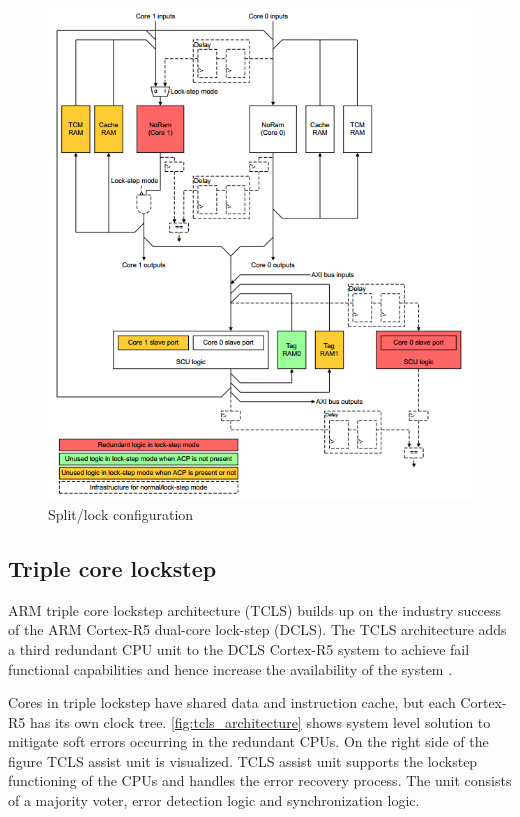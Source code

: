 \begin{figure}[H]

      \centering
      \includegraphics[width=1\linewidth]{images/split_lock_configuration.png}
      \caption{Split/lock configuration \citep{cortex_r8_reference_manual}}
      \label{fig:split_lock_configuration}
    
\end{figure}

\subsection{Triple core lockstep}

ARM triple core lockstep architecture (TCLS) builds up on the industry success of the ARM Cortex-R5 dual-core lock-step (DCLS). The TCLS architecture adds a third redundant CPU unit to the DCLS Cortex-R5 system to achieve fail functional capabilities and hence increase the availability of the system \citep{TCLS_cortex_r}.

Cores in triple lockstep have shared data and instruction cache, but each Cortex-R5 has its own clock tree. \autoref{fig:tcls_architecture} shows system level solution to mitigate soft errors occurring in the redundant CPUs. On the right side of the figure TCLS assist unit is visualized. TCLS assist unit supports the lockstep functioning of the CPUs and handles the error recovery process. The unit consists of a majority voter, error detection logic and synchronization logic.


